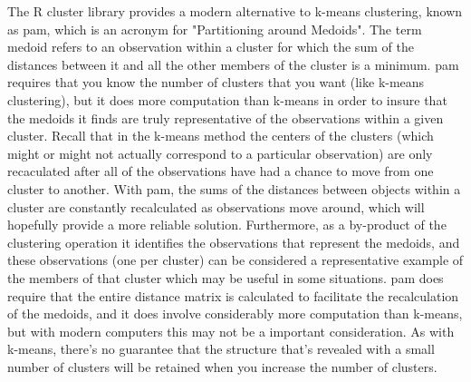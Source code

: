 The R cluster library provides a modern alternative to k-means clustering, known as pam, which is an acronym for "Partitioning around Medoids". The term medoid refers to an observation within a cluster for which the sum of the distances between it and all the other members of the cluster is a minimum. pam requires that you know the number of clusters that you want (like k-means clustering), but it does more computation than k-means in order to insure that the medoids it finds are truly representative of the observations within a given cluster. Recall that in the k-means method the centers of the clusters (which might or might not actually correspond to a particular observation) are only recaculated after all of the observations have had a chance to move from one cluster to another. With pam, the sums of the distances between objects within a cluster are constantly recalculated as observations move around, which will hopefully provide a more reliable solution. Furthermore, as a by-product of the clustering operation it identifies the observations that represent the medoids, and these observations (one per cluster) can be considered a representative example of the members of that cluster which may be useful in some situations. pam does require that the entire distance matrix is calculated to facilitate the recalculation of the medoids, and it does involve considerably more computation than k-means, but with modern computers this may not be a important consideration. As with k-means, there's no guarantee that the structure that's revealed with a small number of clusters will be retained when you increase the number of clusters.
